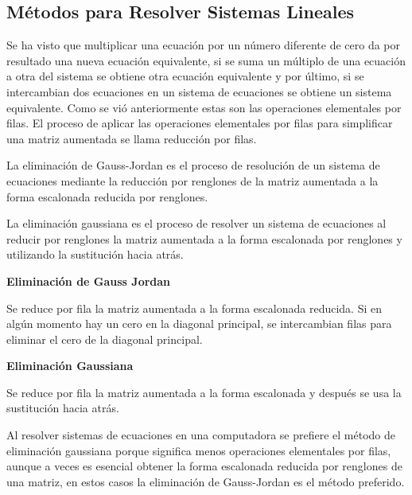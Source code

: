 \documentclass{article}
\begin{document}
\subsection{Métodos para Resolver Sistemas Lineales}

Se ha visto que multiplicar una ecuación por un número diferente de cero da por resultado una nueva ecuación equivalente, si se suma un múltiplo de una ecuación a otra del sistema se obtiene otra ecuación equivalente y por último, si se intercambian dos ecuaciones en un sistema de ecuaciones se obtiene un sistema equivalente. Como se vió anteriormente estas son las operaciones elementales por filas. El proceso de aplicar las operaciones elementales por filas para simplificar una matriz aumentada se llama reducción por filas. 

La eliminación de Gauss-Jordan es el proceso de resolución de un sistema de ecuaciones mediante la reducción por renglones de la matriz aumentada a la forma escalonada reducida por renglones.

La eliminación gaussiana es el proceso de resolver un sistema de ecuaciones al reducir por renglones la matriz aumentada a la forma escalonada por renglones y utilizando la sustitución hacia atrás.

\begin{tcolorbox}[colback=blue!10!white,colframe=blue!60!black,title=Métodos]
    \begin{large}
        \textbf{Eliminación de Gauss Jordan}
    \end{large}

    Se reduce por fila la matriz aumentada a la forma escalonada reducida. Si en algún momento hay un cero en la diagonal principal, se intercambian filas para eliminar el cero de la diagonal principal. \newline

    \begin{large}
        \textbf{Eliminación Gaussiana}
    \end{large}

    Se reduce por fila la matriz aumentada a la forma escalonada y después se usa la sustitución hacia atrás.
\end{tcolorbox}

Al resolver sistemas de ecuaciones en una computadora se prefiere el método de eliminación gaussiana porque significa menos operaciones elementales por filas, aunque a veces es esencial obtener la forma escalonada reducida por renglones de una matriz, en estos casos la eliminación de Gauss-Jordan es el método preferido.
\end{document}

